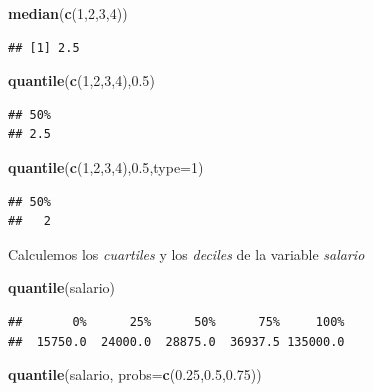 \documentclass[]{book}
\newenvironment{Shaded}{\begin{snugshade}}{\end{snugshade}}
\newcommand{\KeywordTok}[1]{\textcolor[rgb]{0.13,0.29,0.53}{\textbf{#1}}}
\newcommand{\DataTypeTok}[1]{\textcolor[rgb]{0.13,0.29,0.53}{#1}}
\newcommand{\DecValTok}[1]{\textcolor[rgb]{0.00,0.00,0.81}{#1}}
\newcommand{\FloatTok}[1]{\textcolor[rgb]{0.00,0.00,0.81}{#1}}
\newcommand{\NormalTok}[1]{#1}
\begin{document}
\begin{Shaded}
\begin{Highlighting}[]
\KeywordTok{median}\NormalTok{(}\KeywordTok{c}\NormalTok{(}\DecValTok{1}\NormalTok{,}\DecValTok{2}\NormalTok{,}\DecValTok{3}\NormalTok{,}\DecValTok{4}\NormalTok{))}
\end{Highlighting}
\end{Shaded}

\begin{verbatim}
## [1] 2.5
\end{verbatim}

\begin{Shaded}
\begin{Highlighting}[]
\KeywordTok{quantile}\NormalTok{(}\KeywordTok{c}\NormalTok{(}\DecValTok{1}\NormalTok{,}\DecValTok{2}\NormalTok{,}\DecValTok{3}\NormalTok{,}\DecValTok{4}\NormalTok{),}\FloatTok{0.5}\NormalTok{)}
\end{Highlighting}
\end{Shaded}

\begin{verbatim}
## 50% 
## 2.5
\end{verbatim}

\begin{Shaded}
\begin{Highlighting}[]
\KeywordTok{quantile}\NormalTok{(}\KeywordTok{c}\NormalTok{(}\DecValTok{1}\NormalTok{,}\DecValTok{2}\NormalTok{,}\DecValTok{3}\NormalTok{,}\DecValTok{4}\NormalTok{),}\FloatTok{0.5}\NormalTok{,}\DataTypeTok{type=}\DecValTok{1}\NormalTok{)}
\end{Highlighting}
\end{Shaded}

\begin{verbatim}
## 50% 
##   2
\end{verbatim}

Calculemos los \emph{cuartiles} y los \emph{deciles} de la variable
\emph{salario}

\begin{Shaded}
\begin{Highlighting}[]
\KeywordTok{quantile}\NormalTok{(salario)}
\end{Highlighting}
\end{Shaded}

\begin{verbatim}
##       0%      25%      50%      75%     100% 
##  15750.0  24000.0  28875.0  36937.5 135000.0
\end{verbatim}

\begin{Shaded}
\begin{Highlighting}[]
\KeywordTok{quantile}\NormalTok{(salario, }\DataTypeTok{probs=}\KeywordTok{c}\NormalTok{(}\FloatTok{0.25}\NormalTok{,}\FloatTok{0.5}\NormalTok{,}\FloatTok{0.75}\NormalTok{))}
\end{Highlighting}
\end{Shaded}
\end{document}

